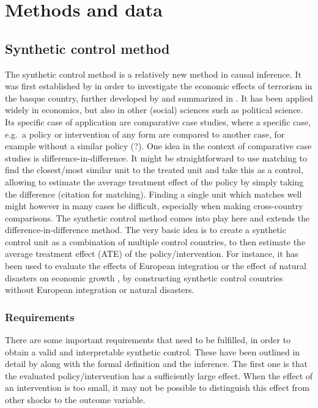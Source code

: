 \documentclass{scrbook}
\begin{document}
\chapter{Methods and data}

\section{Synthetic control method}

The synthetic control method is a relatively new method in causal
inference. It was first established by \textcite{abadie_economic_2003}
in order to investigate the economic effects of terrorism in the basque
country, further developed by \textcite{abadie_synthetic_2010} and
summarized in \textcite{abadie_using_2021}. It has been applied widely
in economics, but also in other (social) sciences such as political
science. Its specific case of application are comparative case studies,
where a specific case, e.g.~a policy or intervention of any form are
compared to another case, for example without a similar policy (?). One
idea in the context of comparative case studies is
difference-in-difference. It might be straightforward to use matching to
find the closest/most similar unit to the treated unit and take this as
a control, allowing to estimate the average treatment effect of the
policy by simply taking the difference (citation for matching). Finding
a single unit which matches well might however in many cases be
difficult, especially when making cross-country comparisons. The
synthetic control method comes into play here and extends the
difference-in-difference method. The very basic idea is to create a
synthetic control unit as a combination of multiple control countries,
to then estimate the average treatment effect (ATE) of the
policy/intervention. For instance, it has been used to evaluate the
effects of European integration \parencite{campos_institutional_2019} or
the effect of natural disasters on economic growth
\parencite{cavallo_catastrophic_2013}, by constructing synthetic control
countries without European integration or natural disasters.

\subsection*{Requirements}

There are some important requirements that need to be fulfilled, in
order to obtain a valid and interpretable synthetic control. These have
been outlined in detail by \textcite{abadie_using_2021} along with the
formal definition and the inference. The first one is that the evaluated
policy/intervention has a sufficiently large effect. When the effect of
an intervention is too small, it may not be possible to distinguish this
effect from other shocks to the outcome variable.
\end{document}
